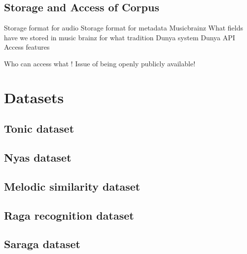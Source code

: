\subsection{Storage and Access of Corpus}


Storage format for audio
Storage format for metadata
Musicbrainz
What fields have we stored in music brainz for what tradition
Dunya system
Dunya API
Access features

Who can access what ! Issue of being openly publicly available!





\section{Datasets}

\subsection{Tonic dataset}

\subsection{Nyas dataset}

\subsection{Melodic similarity dataset}

\subsection{Raga recognition dataset}

\subsection{Saraga dataset}








